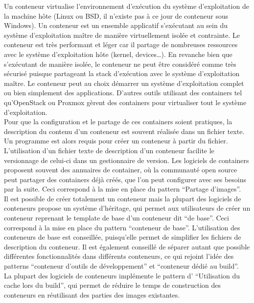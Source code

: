         Un conteneur virtualise l'environnement d'exécution du système d'exploitation de la machine hôte (Linux ou BSD, il n'existe pas à ce jour de conteneur sous Windows). Un conteneur est un ensemble applicatif s'exécutant au sein du système d'exploitation maître de manière virtuellement isolée et contrainte. Le conteneur est très performant et léger car il partage de nombreuses ressources avec le système d'exploitation hôte (kernel, devices\dots). En revanche bien que s'exécutant de manière isolée, le conteneur ne peut être considéré comme très sécurisé puisque partageant la stack d'exécution avec le système d'exploitation maître. Le conteneur peut au choix démarrer un système d'exploitation complet ou bien simplement des applications. D'autres outils utilisant des containers tel qu'OpenStack ou Proxmox gèrent des containers pour virtualiser tout le système d'exploitation.\\

        Pour que la configuration et le partage de ces containers soient pratiques, la description du contenu d'un conteneur est souvent réalisée dans un fichier texte. Un programme est alors requis pour créer un conteneur à partir du fichier. L'utilisation d'un fichier texte de description d'un conteneur facilite le versionnage de celui-ci dans un gestionnaire de version. Les logiciels de containers proposent souvent des annuaires de container, où la communauté open source peut partager des containers déjà créés, que l'on peut configurer avec ses besoins par la suite. Ceci correspond à la mise en place du pattern \enquote{Partage d'images}.\\

        Il est possible de créer totalement un conteneur mais la plupart des logiciels de conteneurs propose un système d'héritage, qui permet aux utilisateurs de créer un conteneur reprenant le template de base d'un conteneur dit \enquote{de base}. Ceci correspond à la mise en place du pattern \enquote{conteneur de base}. L'utilisation des conteneurs de base est conseillée, puisqu'elle permet de simplifier les fichiers de description du conteneur. Il est également conseillé de séparer autant que possible différentes fonctionnalités dans différents conteneurs, ce qui rejoint l'idée des patterns \enquote{conteneur d’outils de développement} et \enquote{conteneur dédié au build}.\\

        La plupart des logiciels de conteneurs implémente le pattern d' \enquote{Utilisation du cache lors du build}, qui permet de réduire le temps de construction des conteneurs en réutilisant des parties des images existantes.\\

